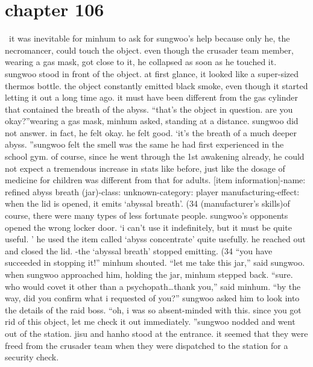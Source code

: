 \section{chapter 106}






 it was inevitable for minhum to ask for sungwoo’s help because only he, the necromancer, could touch the object.
even though the crusader team member, wearing a gas mask, got close to it, he collapsed as soon as he touched it.
sungwoo stood in front of the object.
at first glance, it looked like a super-sized thermos bottle.
 the object constantly emitted black smoke, even though it started letting it out a long time ago.
 it must have been different from the gas cylinder that contained the breath of the abyss.
“that’s the object in question.
 are you okay?”wearing a gas mask, minhum asked, standing at a distance.
 sungwoo did not answer.
in fact, he felt okay.
 he felt good.
‘it’s the breath of a much deeper abyss.
”sungwoo felt the smell was the same he had first experienced in the school gym.
 of course, since he went through the 1st awakening already, he could not expect a tremendous increase in stats like before, just like the dosage of medicine for children was different from that for adults.
[item information]-name: refined abyss breath (jar)-class: unknown-category: player manufacturing-effect: when the lid is opened, it emits ‘abyssal breath’.
 (34%
 (manufacturer’s skills)of course, there were many types of less fortunate people.
 sungwoo’s opponents opened the wrong locker door.
‘i can’t use it indefinitely, but it must be quite useful.
’
he used the item called ‘abyss concentrate’ quite usefully.
he reached out and closed the lid.
-the ‘abyssal breath’ stopped emitting.
 (34%
“you have succeeded in stopping it!” minhum shouted.
“let me take this jar,” said sungwoo.
when sungwoo approached him, holding the jar, minhum stepped back.
“sure.
 who would covet it other than a psychopath…thank you,” said minhum.
“by the way, did you confirm what i requested of you?” sungwoo asked him to look into the details of the raid boss.
“oh, i was so absent-minded with this.
 since you got rid of this object, let me check it out immediately.
”sungwoo nodded and went out of the station.
 jisu and hanho stood at the entrance.
it seemed that they were freed from the crusader team when they were dispatched to the station for a security check.
